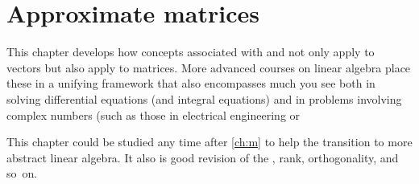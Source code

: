 
\chapter{Approximate matrices}
\label{ch:am}

\minitoc



This chapter 
develops how concepts associated with  and  not only apply to vectors but also apply to matrices.  
More advanced courses on linear algebra place these in a unifying framework that also encompasses much you see both in solving differential equations (and integral equations) and in problems involving complex numbers (such as those in electrical engineering or 

This chapter could be studied any time after \cref{ch:m} to help the transition to more abstract linear algebra.  
It also is good revision of the \svd, rank, orthogonality, and so~on.



\begin{comment} 
Huge applications of \svd{}s to video compression, experimental errors, and other areas.
Introduce digital \idx{image compression} by \svd{}s \pooliv{p.607--8} \holti{p.336--7}  \cite[\S07]{Davis99a}.
\cite{Higham86} mentions applications of \idx{polar decomposition} to the Orthogonal Procrustes problem.
\end{comment}







\endinput

